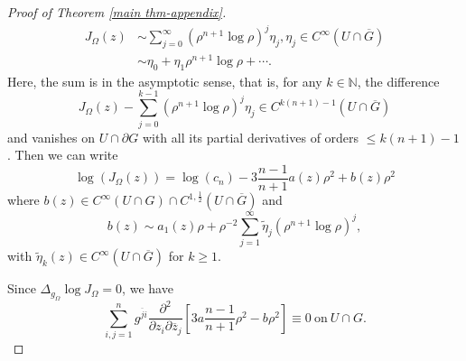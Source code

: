 \documentclass[a4paper,centertags,oneside,12pt]{amsart}
\numberwithin{equation}{section}
\begin{document}
\begin{proof}[Proof of Theorem \ref{main thm-appendix}]
\begin{equation}
\begin{split}
    J_{\Omega}(z)&\sim\sum_{j=0}^\infty(\rho^{n+1}\log\rho)^j\eta_j, \eta_j\in C^\infty(U\cap\overline G)\\
    &    \sim\eta_0+\eta_1\rho^{n+1}\log\rho+\cdots.
    \end{split}
\end{equation}
Here, the sum is in the asymptotic sense, that is, for any $k\in\mathbb N$, the difference $$J_\Omega(z)-\sum_{j=0}^{k-1}(\rho^{n+1}\log\rho)^j\eta_j\in C^{k(n+1)-1}(U\cap\overline G)$$ and vanishes on $U\cap\partial G$ with all its partial derivatives of orders $\leq k(n+1)-1$. 
Then we can write 
\begin{equation}
   \log( J_{\Omega}(z))=\log(c_n)-3\frac{n-1}{n+1}a(z)\rho^2+b(z)\rho^2
\end{equation}
where $b(z)\in C^\infty(U\cap G)\cap C^{1,\frac{1}{2}}(U\cap\overline G)$ and 
\begin{equation}\label{5-24-a1}
b(z)\sim a_1(z)\rho+\rho^{-2}\sum_{j=1}^\infty \tilde \eta_{j}(\rho^{n+1}\log\rho)^j,
\end{equation}
with $\tilde \eta_k(z)\in C^\infty(U\cap\overline G)$ for $k\ge 1.$








Since 
 $\Delta_{g_\Omega}\log J_{\Omega}=0$,  we have 
\begin{equation}\label{5-23-a3}
\sum_{i, j=1}^ng^{\overline ji}\frac{\partial^2}{\partial z_i\partial\overline z_j}[3a\frac{n-1}{n+1}\rho^2- b\rho^2]\equiv 0~\text{on} ~U\cap G.
\end{equation}


\end{proof}
\end{document}
